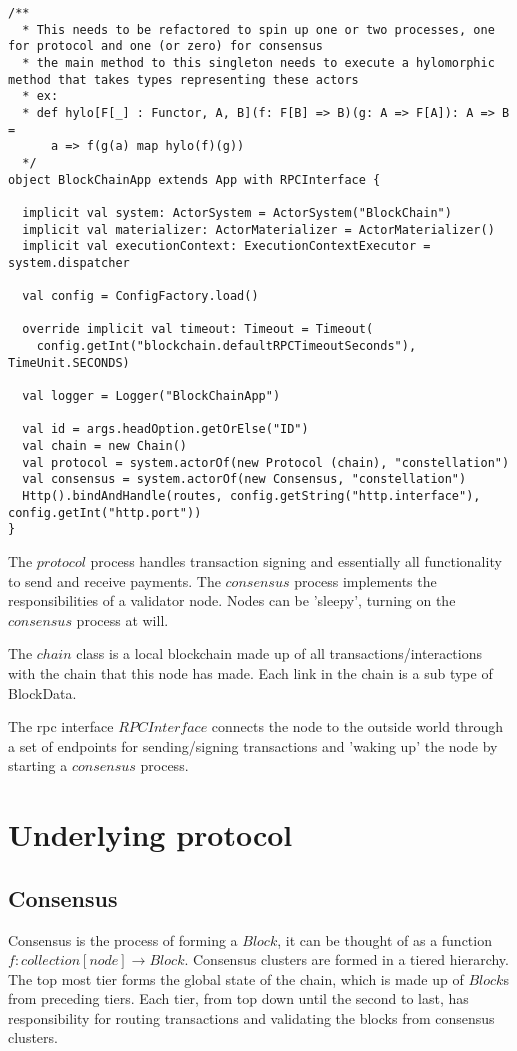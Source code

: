 \documentclass{article}
\begin{document}
\begin{lstlisting}
/**
  * This needs to be refactored to spin up one or two processes, one for protocol and one (or zero) for consensus
  * the main method to this singleton needs to execute a hylomorphic method that takes types representing these actors
  * ex:
  * def hylo[F[_] : Functor, A, B](f: F[B] => B)(g: A => F[A]): A => B =
      a => f(g(a) map hylo(f)(g))
  */
object BlockChainApp extends App with RPCInterface {

  implicit val system: ActorSystem = ActorSystem("BlockChain")
  implicit val materializer: ActorMaterializer = ActorMaterializer()
  implicit val executionContext: ExecutionContextExecutor = system.dispatcher

  val config = ConfigFactory.load()

  override implicit val timeout: Timeout = Timeout(
    config.getInt("blockchain.defaultRPCTimeoutSeconds"), TimeUnit.SECONDS)

  val logger = Logger("BlockChainApp")

  val id = args.headOption.getOrElse("ID")
  val chain = new Chain()
  val protocol = system.actorOf(new Protocol (chain), "constellation")
  val consensus = system.actorOf(new Consensus, "constellation")
  Http().bindAndHandle(routes, config.getString("http.interface"), config.getInt("http.port"))
}

\end{lstlisting}

The $protocol$ process handles transaction signing and essentially all functionality to send and receive payments. The $consensus$ process implements the responsibilities of a validator node. Nodes can be 'sleepy', turning on the $consensus$ process at will.

The $chain$ class is a local blockchain made up of all transactions/interactions with the chain that this node has made. Each link in the chain is a sub type of BlockData.

The rpc interface $RPCInterface$ connects the node to the outside world through a set of endpoints for sending/signing transactions and 'waking up' the node by starting a $consensus$ process.

\section{Underlying protocol}
\subsection{Consensus}
Consensus is the process of forming a $Block$, it can be thought of as a function $f: collection[node] \rightarrow Block$. Consensus clusters are formed in a tiered hierarchy. The top most tier forms the global state of the chain, which is made up of $Block$s from preceding tiers. Each tier, from top down until the second to last, has responsibility for routing transactions and validating the blocks from consensus clusters. 
\end{document}
